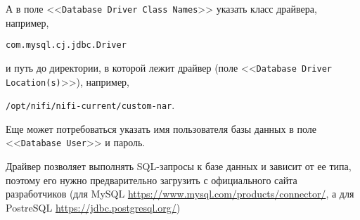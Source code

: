 \documentclass[%
	11pt,
	a4paper,
	utf8,
		]{article}
\begin{document}
А в поле <<\verb|Database Driver Class Names|>> указать класс драйвера, например,

\noindent\verb*|com.mysql.cj.jdbc.Driver|

\noindent и путь до директории, в которой лежит драйвер (поле <<\verb|Database Driver Location(s)|>>), например,

\noindent\verb|/opt/nifi/nifi-current/custom-nar|.

Еще может потребоваться указать имя пользователя базы данных в поле <<\verb|Database User|>> и пароль.

Драйвер позволяет выполнять SQL-запросы к базе данных и зависит от ее типа, поэтому его нужно предварительно загрузить с официального сайта разработчиков (для MySQL \url{https://www.mysql.com/products/connector/}, а для PostreSQL \url{https://jdbc.postgresql.org/})




\begin{thebibliography}{99}	
\end{thebibliography}


\lstlistoflistings{}
\end{document}

